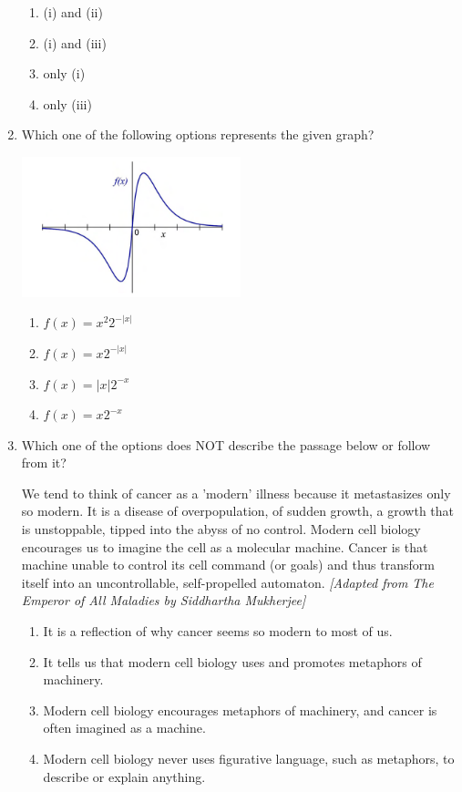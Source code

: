 \documentclass[journal,13pt,onecolumn]{exam}
\theoremstyle{remark}
\begin{document}
\begin{enumerate}[label=Q.\arabic*]
\begin{enumerate}
    \item (i) and (ii)
    \item (i) and (iii)
    \item only (i)
    \item only (iii)
\end{enumerate}
\item Which one of the following options represents the given graph?

\begin{center}
    \includegraphics[width=0.5\textwidth]{figs/a2q7.png}
\end{center}

\begin{enumerate}
    \item \( f(x) = x^2 2^{-|x|} \)
    \item \( f(x) = x 2^{-|x|} \)
    \item \( f(x) = |x| 2^{-x} \)
    \item \( f(x) = x 2^{-x} \)
\end{enumerate}
\newpage

\item Which one of the options does NOT describe the passage below or follow from it?

We tend to think of cancer as a 'modern' illness because it metastasizes only so modern. It is a disease of overpopulation, of sudden growth, a growth that is unstoppable, tipped into the abyss of no control. Modern cell biology encourages us to imagine the cell as a molecular machine. Cancer is that machine unable to control its cell command (or goals) and thus transform itself into an uncontrollable, self-propelled automaton.
\vspace{1em}
\textit{[Adapted from The Emperor of All Maladies by Siddhartha Mukherjee]}

\begin{enumerate}
    \item It is a reflection of why cancer seems so modern to most of us.
    \item It tells us that modern cell biology uses and promotes metaphors of machinery.
    \item Modern cell biology encourages metaphors of machinery, and cancer is often imagined as a machine.
    \item Modern cell biology never uses figurative language, such as metaphors, to describe or explain anything.
\end{enumerate}


\end{enumerate}
\end{document}
